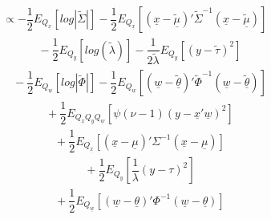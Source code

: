 \documentclass[fleqn]{minimal}
\begin{document}
\begin{align*}
  \ \ \ \ \ \
  \propto
  - \dfrac{1}{2}
  E_{Q_{\underline{x}}}
  \left[
    log \left| \tilde{\Sigma} \right|
  \right]
  - \dfrac{1}{2}
  E_{Q_{\underline{x}}}
  \left[
    \left( \underline{x} - \underline{\tilde{\mu}}\right)'
    \tilde{\Sigma}^{-1}
    \left( \underline{x} - \underline{\tilde{\mu}}\right)
  \right]
\end{align*}
\begin{align*}
  \ \ \ \ \ \ \ \ \ \
  - \dfrac{1}{2}
  E_{Q_{y}}
  \left[
    log \left(
      \tilde{\lambda}
    \right)
  \right]
  - \dfrac{1}{2\tilde{\lambda}}
  E_{Q_{y}}
  \left[
    \left(y - \tilde{\tau}\right)^2
  \right]
\end{align*}
\begin{align*}
  \ \ \ \ \ \ \ \ \ \
  - \dfrac{1}{2}
  E_{Q_{\underline{w}}}
  \left[
    log \left| \tilde{\Phi} \right|
  \right]
  - \dfrac{1}{2}
  E_{Q_{\underline{w}}}
  \left[
    \left( \underline{w} - \underline{\tilde{\theta}}\right)'
    \tilde{\Phi}^{-1}
    \left( \underline{w} - \underline{\tilde{\theta}}\right)
  \right]
\end{align*}
\begin{align*}
  \ \ \ \ \ \ \ \ \ \
  + \dfrac{1}{2} E_{Q_{\underline{x}} Q_{y} Q_{\underline{w}}}
  \left[
    \psi\left(\nu-1\right)
    \left( y - \underline{x}'\underline{w}\right)^2
  \right]
\end{align*}
\begin{align*}
  \ \ \ \ \ \ \ \ \ \
  + \dfrac{1}{2} E_{Q_{\underline{x}} }
  \left[
    \left( \underline{x} - \underline{\mu}\right)'
    \Sigma^{-1}
    \left( \underline{x} - \underline{\mu}\right)
  \right]
\end{align*}
\begin{align*}
  \ \ \ \ \ \ \ \ \ \
  + \dfrac{1}{2} E_{Q_{y}}
  \left[
    \dfrac{1}{\lambda}
    \left(y - \tau\right)^2
  \right]
\end{align*}
\begin{align*}
  \ \ \ \ \ \ \ \ \ \
  + \dfrac{1}{2} E_{Q_{\underline{w}}}
  \left[
    \left( \underline{w} - \underline{\theta}\right)'
    \Phi^{-1}
    \left( \underline{w} - \underline{\theta}\right)
  \right]
\end{align*}
\end{document}

